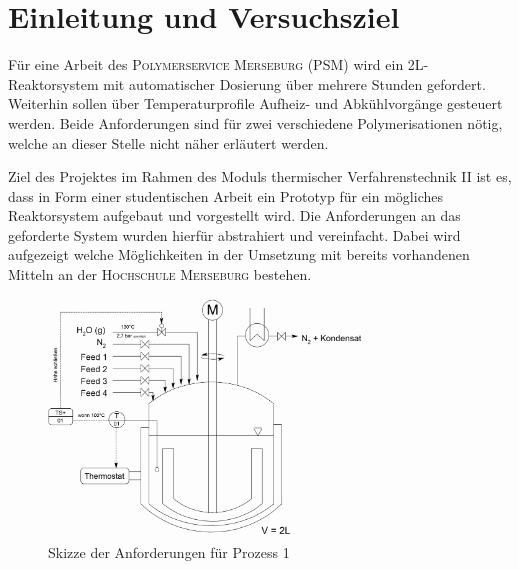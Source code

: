 \section{Einleitung und Versuchsziel}
\label{sec:aufgabenstellung}

Für eine Arbeit des \textsc{Polymerservice Merseburg (PSM)} wird ein 2L-Reaktorsystem mit automatischer Dosierung über mehrere Stunden gefordert. Weiterhin sollen über Temperaturprofile Aufheiz- und Abkühlvorgänge gesteuert werden. Beide Anforderungen sind für zwei verschiedene Polymerisationen nötig, welche an dieser Stelle nicht näher erläutert werden. 

Ziel des Projektes im Rahmen des Moduls thermischer Verfahrenstechnik II ist es, dass in Form einer studentischen Arbeit ein Prototyp für ein mögliches Reaktorsystem aufgebaut und vorgestellt wird. Die Anforderungen an das geforderte System wurden hierfür abstrahiert und vereinfacht. Dabei wird aufgezeigt welche Möglichkeiten in der Umsetzung mit bereits vorhandenen Mitteln an der \textsc{Hochschule Merseburg} bestehen.

\begin{figure}[h!]
	\centering
	\includegraphics[width=0.75\textwidth]{img/Skizze_Prozess_1.png}
	\caption{Skizze der Anforderungen für Prozess 1}
	\label{fig:prozess 1}
\end{figure}
\FloatBarrier

